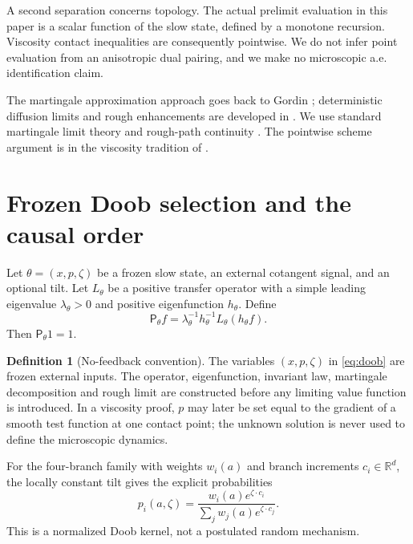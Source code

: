 \documentclass[11pt,reqno]{amsart}
\theoremstyle{definition}
\newtheorem{definition}[theorem]{Definition}
\theoremstyle{remark}
\newcommand{\R}{\mathbb R}
\begin{document}
A second separation concerns topology.  The actual prelimit evaluation in this
paper is a scalar function of the slow state, defined by a monotone recursion.
Viscosity contact inequalities are consequently pointwise.  We do not infer
point evaluation from an anisotropic dual pairing, and we make no microscopic
a.e. identification claim.

The martingale approximation approach goes back to Gordin
\cite{Gordin1969}; deterministic diffusion limits and rough enhancements are
developed in \cite{MelbourneStuart2011,KellyMelbourne2016,KellyMelbourne2017,
ChevyrevFrizKorepanovMelbourne2020}.  We use standard martingale limit theory
\cite{HallHeyde1980,JacodShiryaev2003} and rough-path continuity
\cite{Lyons1998,FrizVictoir2010,FrizHairer2014}.  The pointwise scheme argument
is in the viscosity tradition of \cite{BarlesSouganidis1991,
CrandallIshiiLions1992}.

\section{Frozen Doob selection and the causal order}\label{sec:doob}

Let $\theta=(x,p,\zeta)$ be a frozen slow state, an external cotangent signal,
and an optional tilt.  Let $L_\theta$ be a positive transfer operator with a
simple leading eigenvalue $\lambda_\theta>0$ and positive eigenfunction
$h_\theta$.  Define
\begin{equation}\label{eq:doob}
 \mathsf P_\theta f
 =\lambda_\theta^{-1}h_\theta^{-1}
   L_\theta(h_\theta f).
\end{equation}
Then $\mathsf P_\theta1=1$.

\begin{definition}[No-feedback convention]\label{def:nofeedback}
The variables $(x,p,\zeta)$ in \eqref{eq:doob} are frozen external inputs.
The operator, eigenfunction, invariant law, martingale decomposition and rough
limit are constructed before any limiting value function is introduced.  In a
viscosity proof, $p$ may later be set equal to the gradient of a smooth test
function at one contact point; the unknown solution is never used to define
the microscopic dynamics.
\end{definition}

For the four-branch family with weights $w_i(a)$ and branch increments
$c_i\in\R^d$, the locally constant tilt gives the explicit probabilities
\begin{equation}\label{eq:pi}
 p_i(a,\zeta)=
 \frac{w_i(a)e^{\zeta\cdot c_i}}
      {\sum_jw_j(a)e^{\zeta\cdot c_j}}.
\end{equation}
This is a normalized Doob kernel, not a postulated random mechanism.
\end{document}
